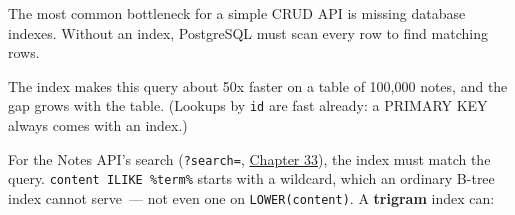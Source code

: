 The most common bottleneck for a simple CRUD API is missing database indexes. Without an index, PostgreSQL must scan every row to find matching rows.

\begin{codebox}[short]

\begin{Shaded}
\begin{Highlighting}[]
 
 \OperatorTok{*} \OperatorTok{\textgreater{}}\OperatorTok{{-}}  \NormalTok{;}

 

 
 \OperatorTok{*} \OperatorTok{\textgreater{}}\OperatorTok{{-}}  \NormalTok{;}
\end{Highlighting}
\end{Shaded}

\end{codebox}

\noindent{}The index makes this query about 50x faster on a table of 100,000 notes, and the gap grows with the table. (Lookups by \texttt{id} are fast already: a PRIMARY KEY always comes with an index.)

For the Notes API's search (\texttt{?search=}, \hyperref[ch:33-logic-execution]{Chapter 33}), the index must match the query. \texttt{content\ ILIKE\ \textquotesingle{}\%term\%\textquotesingle{}} starts with a wildcard, which an ordinary B-tree index cannot serve~--- not even one on \texttt{LOWER(content)}. A \textbf{trigram} index can:

